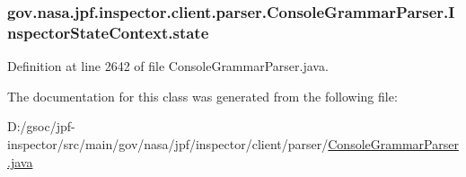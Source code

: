\subsubsection[{\texorpdfstring{state}{state}}]{ gov.\+nasa.\+jpf.\+inspector.\+client.\+parser.\+Console\+Grammar\+Parser.\+Inspector\+State\+Context.\+state}\hypertarget{classgov_1_1nasa_1_1jpf_1_1inspector_1_1client_1_1parser_1_1_console_grammar_parser_1_1_inspector_state_context_a29b2111ea03c558aee71e2f2e6ee6369}{}\label{classgov_1_1nasa_1_1jpf_1_1inspector_1_1client_1_1parser_1_1_console_grammar_parser_1_1_inspector_state_context_a29b2111ea03c558aee71e2f2e6ee6369}


Definition at line 2642 of file Console\+Grammar\+Parser.\+java.



The documentation for this class was generated from the following file\+:\begin{DoxyCompactItemize}
\item 
D\+:/gsoc/jpf-\/inspector/src/main/gov/nasa/jpf/inspector/client/parser/\hyperlink{_console_grammar_parser_8java}{Console\+Grammar\+Parser.\+java}\end{DoxyCompactItemize}

